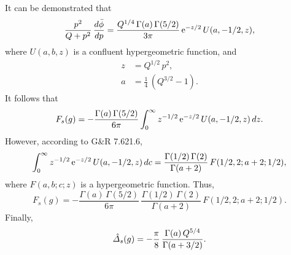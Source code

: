 \documentclass[titlepage=false,12pt]{article}
\begin{document}
It can be demonstrated that
\begin{equation}
\frac{p^2}{Q+p^2}\,\frac{d\bar{\phi}}{dp}= \frac{Q^{1/4}\,\Gamma(a)\,\Gamma(5/2)}{3\pi}\,{\rm e}^{-z/2}\,U(a,-1/2,z),
\end{equation}
where $U(a,b,z)$ is a confluent hypergeometric function, and
\begin{align}
z &= Q^{1/2}\,p^2,\\[0.5ex]
a&= \frac{1}{4}\,(Q^{3/2}-1).
\end{align}
It follows that
\begin{equation}
F_s(g) =-\frac{\Gamma(a)\,\Gamma(5/2)}{6\pi}\int_0^\infty z^{-1/2}\,{\rm e}^{-z/2}\,U(a,-1/2,z)\,dz.
\end{equation}
However, according to G\&R 7.621.6,
\begin{equation}
\int_0^\infty z^{-1/2}\,{\rm e}^{-z/2}\,U(a,-1/2,z)\,dc = \frac{\Gamma(1/2)\,\Gamma(2)}{\Gamma(a+2)}\,F(1/2, 2;a+2;1/2),
\end{equation}
where $F(a,b;c;z)$ is a hypergeometric function. Thus,
\begin{equation}
F_s(g) = - \frac{\Gamma(a)\,\Gamma(5/2)}{6\pi} \,\frac{\Gamma(1/2)\,\Gamma(2)}{\Gamma(a+2)}\,F(1/2, 2;a+2;1/2).
\end{equation}
Finally,
\begin{equation}
\hat{\mit\Delta}_s(g) = -\frac{\pi}{8}\,\frac{\Gamma(a)\,Q^{5/4}}{\Gamma(a+3/2)}.
\end{equation}
\end{document}
